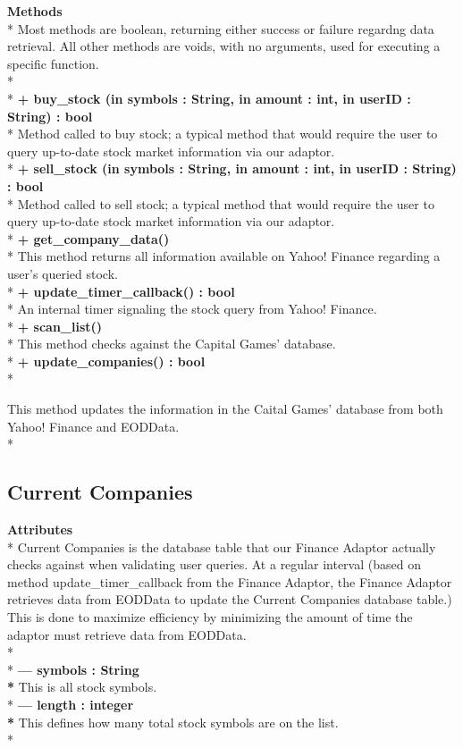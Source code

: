 {\bfseries Methods} \\*
Most methods are boolean, returning either success or failure regardng data retrieval.
All other methods are voids, with no arguments, used for executing a specific function. \\* \\*
{\bfseries + buy\_stock (in symbols : String, in amount : int, in userID : String) : bool } \\*
	Method called to buy stock; a typical method that would require the user to query
	up-to-date stock market information via our adaptor. \\*
{\bfseries + sell\_stock (in symbols : String, in amount : int, in userID : String) : bool } \\*
	Method called to sell stock; a typical method that would require the user to query
	up-to-date stock market information via our adaptor. \\*
{\bfseries + get\_company\_data() } \\* 
	This method returns all information available on Yahoo! Finance regarding a user's queried 
	stock. \\*
{\bfseries + update\_timer\_callback() : bool } \\*
	An internal timer signaling the stock query from Yahoo! Finance.  \\*
{\bfseries + scan_list()  }\\*
	This method checks against the Capital Games' database. \\*
{\bfseries + update\_companies() : bool } \\*

	This method updates the information in the Caital Games' database from both Yahoo! Finance
	and EODData. \\*
\subsection{Current Companies}
 

{\bfseries Attributes} \\*
Current Companies is the database table that our Finance Adaptor actually checks against 
when validating user queries. At a regular interval (based on method update_timer_callback from
the Finance Adaptor, the Finance Adaptor retrieves data from EODData to update the Current 
Companies database table.) This is done to maximize efficiency by minimizing the amount of time
the adaptor must retrieve data from EODData. \\* \\*
{\bfseries --- symbols : String \\* }
	This is all stock symbols. \\* 
{\bfseries --- length : integer \\* }
	This defines how many total stock symbols are on the list. \\* 


